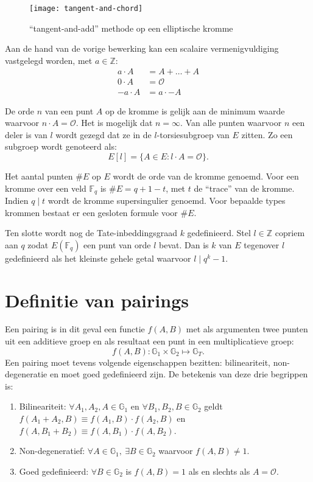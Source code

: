 \begin{figure}[h]
	\centering
		\texttt{[image: tangent-and-chord]}
		\caption{``tangent-and-add'' methode op een elliptische kromme\label{figuur-pairings-tangent-and-chord}}
\end{figure}

Aan de hand van de vorige bewerking kan een scalaire vermenigvuldiging vastgelegd worden, met $a \in \mathbb{Z}$:
\[\begin{aligned}
a \cdot A	&= A + \ldots + A\\
0 \cdot A	&= \mathcal{O}\\
-a \cdot A	&= a \cdot -A
\end{aligned}\]

De orde $n$ van een punt $A$ op de kromme is gelijk aan de minimum waarde waarvoor $n \cdot A = \mathcal{O}$. Het is mogelijk dat $n = \infty$. Van alle punten waarvoor $n$ een deler is van $l$ wordt gezegd dat ze in de $l$-torsiesubgroep van $E$ zitten. Zo een subgroep wordt genoteerd als:
\[E[l] = \{ A \in E : l \cdot A = \mathcal{O} \}.\]

Het aantal punten $\#E$ op $E$ wordt de orde van de kromme genoemd. Voor een kromme over een veld $\mathbb{F}_q$ is $\#E = q + 1 - t$, met $t$ de ``trace'' van de kromme. Indien $q \mid t$ wordt de kromme supersingulier genoemd. Voor bepaalde types krommen bestaat er een gesloten formule voor $\#E$.

Ten slotte wordt nog de Tate-inbeddingsgraad $k$ gedefinieerd. Stel $l \in \mathbb{Z}$ copriem aan $q$ zodat $E(\mathbb{F}_q)$ een punt van orde $l$ bevat. Dan is $k$ van $E$ tegenover $l$ gedefinieerd als het kleinste gehele getal waarvoor $l \mid q^k - 1$.

\section{Definitie van pairings}

Een pairing is in dit geval een functie $f(A, B)$ met als argumenten twee punten uit een additieve groep en als resultaat een punt in een multiplicatieve groep:
\[f(A, B): \mathbb{G}_1 \times \mathbb{G}_2 \mapsto \mathbb{G}_T.\]
Een pairing moet tevens volgende eigenschappen bezitten: bilineariteit, non-degeneratie en moet goed gedefinieerd zijn. De betekenis van deze drie begrippen is:

\begin{enumerate}
	\item Bilineariteit: $\forall A_1, A_2, A \in \mathbb{G}_1$ en $\forall B_1, B_2, B \in \mathbb{G}_2$ geldt $f(A_1 + A_2, B) \equiv f(A_1, B) \cdot f(A_2, B)$ en $f(A, B_1 + B_2) \equiv f(A, B_1) \cdot f(A, B_2)$.

	\item Non-degeneratief: $\forall A \in \mathbb{G}_1, \: \exists B \in \mathbb{G}_2$ waarvoor $f(A, B) \neq 1$.

	\item Goed gedefinieerd: $\forall B \in \mathbb{G}_2$ is $f(A, B) = 1$ als en slechts als $A = \mathcal{O}$.
\end{enumerate}

